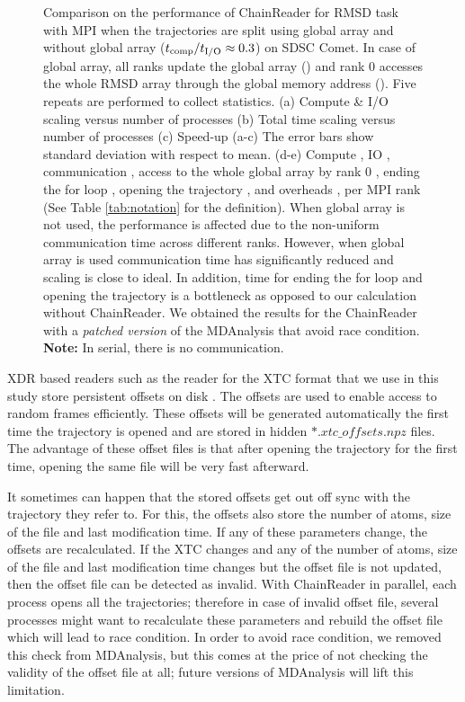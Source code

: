 \begin{figure}[ht!]
\caption{Comparison on the performance of ChainReader for RMSD task with MPI when the trajectories are split using global array and without global array (${t}_{\text{comp}}/{t}_{\text{I/O}} \approx 0.3$) on SDSC Comet.
In case of global array, all ranks update the global array () and rank 0 accesses the whole RMSD array through the global memory address ().
Five repeats are performed to collect statistics. (a) Compute \& I/O scaling versus number of processes (b) Total time scaling versus number of processes (c) Speed-up (a-c) The error bars show standard deviation with respect to mean. (d-e) Compute \tcomp, IO \tIO, communication \tcomm, access to the whole global array by rank 0 , ending the for loop , 
opening the trajectory , and overheads ,  per MPI rank (See Table \ref{tab:notation} for the definition). When global array is not used, the performance is affected due to the non-uniform communication time across different ranks. However, when global array is used communication time has significantly reduced and scaling is close to ideal. In addition, time for ending the for loop  and 
opening the trajectory  is a bottleneck as opposed to our calculation without ChainReader. We obtained the results for the ChainReader with a \emph{patched version} of the MDAnalysis that avoid race condition. \textbf{Note:} In serial, there is no communication.}
\label{fig:MPIwithIO-split-chain-reader}
\end{figure}

XDR based readers such as the reader for the XTC format that we use in this study store persistent offsets on disk \citep{Gowers:2016aa}. 
The offsets are used to enable access to random frames efficiently. 
These offsets will be generated automatically the first time the trajectory is opened and are stored in hidden $\ast.xtc\_offsets.npz$ files. 
The advantage of these offset files is that after opening the trajectory for the first time, opening the same file will be very fast afterward. 

It sometimes can happen that the stored offsets get out off sync with the trajectory they refer to. 
For this, the offsets also store the number of atoms, size of the file and last modification time. 
If any of these parameters change, the offsets are recalculated. 
If the XTC changes and any of the number of atoms, size of the file and last modification time changes but the offset file is not updated, then the offset file can be detected as invalid.
With ChainReader in parallel, each process opens all the trajectories; therefore in case of invalid offset file, several processes might want to recalculate these parameters and rebuild the offset file which will lead to race condition.
In order to avoid race condition, we removed this check from MDAnalysis, but this comes at the price of not checking the validity of the offset file at all; future versions of MDAnalysis will lift this limitation.
 
